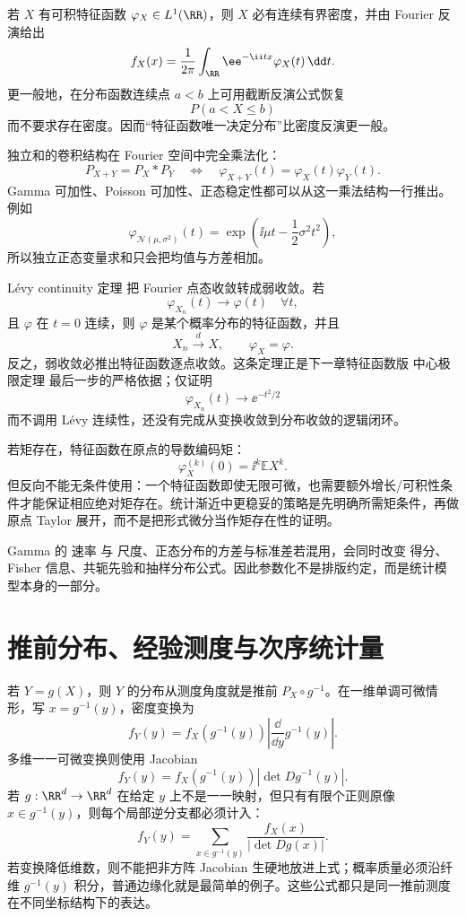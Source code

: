若 $X$ 有可积特征函数 $\varphi_X\in L^1(\RR)$，则 $X$ 必有连续有界密度，并由 Fourier 反演给出
\begin{equation*}f_X(x)
=\frac1{2\pi}
\int_{\RR}\ee^{-\ii tx}\varphi_X(t)\,\dd t.\end{equation*}
更一般地，在分布函数连续点 $a<b$ 上可用截断反演公式恢复
\[
P(a<X\le b)
\]
而不要求存在密度。因而“特征函数唯一决定分布”比密度反演更一般。

独立和的卷积结构在 Fourier 空间中完全乘法化：
\[
P_{X+Y}=P_X*P_Y
\quad\Longleftrightarrow\quad
\varphi_{X+Y}(t)=\varphi_X(t)\varphi_Y(t).
\]
Gamma 可加性、Poisson 可加性、正态稳定性都可以从这一乘法结构一行推出。例如
\[
\varphi_{\mathcal N(\mu,\sigma^2)}(t)
=\exp\!\left(\ii\mu t-\frac12\sigma^2t^2\right),
\]
所以独立正态变量求和只会把均值与方差相加。

L\'evy continuity 定理 把 Fourier 点态收敛转成弱收敛。若
\[
\varphi_{X_n}(t)\to\varphi(t)
\quad\forall t,
\]
且 $\varphi$ 在 $t=0$ 连续，则 $\varphi$ 是某个概率分布的特征函数，并且
\begin{equation*}X_n\xrightarrow{d} X,
\qquad
\varphi_X=\varphi.\end{equation*}
反之，弱收敛必推出特征函数逐点收敛。这条定理正是下一章特征函数版 中心极限定理 最后一步的严格依据；仅证明
\[
\varphi_{X_n}(t)\to\ee^{-t^2/2}
\]
而不调用 L\'evy 连续性，还没有完成从变换收敛到分布收敛的逻辑闭环。

若矩存在，特征函数在原点的导数编码矩：
\[
\varphi_X^{(k)}(0)=\ii^k\mathbb E X^k.
\]
但反向不能无条件使用：一个特征函数即使无限可微，也需要额外增长/可积性条件才能保证相应绝对矩存在。统计渐近中更稳妥的策略是先明确所需矩条件，再做原点 Taylor 展开，而不是把形式微分当作矩存在性的证明。

\begin{note}[参数化决定后续全部微分结构]
Gamma 的 速率 与 尺度、正态分布的方差与标准差若混用，会同时改变 得分、Fisher 信息、共轭先验和抽样分布公式。因此参数化不是排版约定，而是统计模型本身的一部分。
\end{note}

\section{推前分布、经验测度与次序统计量}

若 $Y=g(X)$，则 $Y$ 的分布从测度角度就是推前 $P_X\circ g^{-1}$。在一维单调可微情形，写 $x=g^{-1}(y)$，密度变换为
\[
 f_Y(y)=f_X(g^{-1}(y))
 \left|\frac{\dd}{\dd y}g^{-1}(y)\right|.
\]
多维一一可微变换则使用 Jacobian
\[
 f_Y(y)=f_X(g^{-1}(y))
 \left|\det Dg^{-1}(y)\right|.
\]
若 $g:\RR^d\to\RR^d$ 在给定 $y$ 上不是一一映射，但只有有限个正则原像 $x\in g^{-1}(y)$，则每个局部逆分支都必须计入：
\[
 f_Y(y)
 =\sum_{x\in g^{-1}(y)}
 \frac{f_X(x)}{|\det Dg(x)|}.
\]
若变换降低维数，则不能把非方阵 Jacobian 生硬地放进上式；概率质量必须沿纤维 $g^{-1}(y)$ 积分，普通边缘化就是最简单的例子。这些公式都只是同一推前测度在不同坐标结构下的表达。

